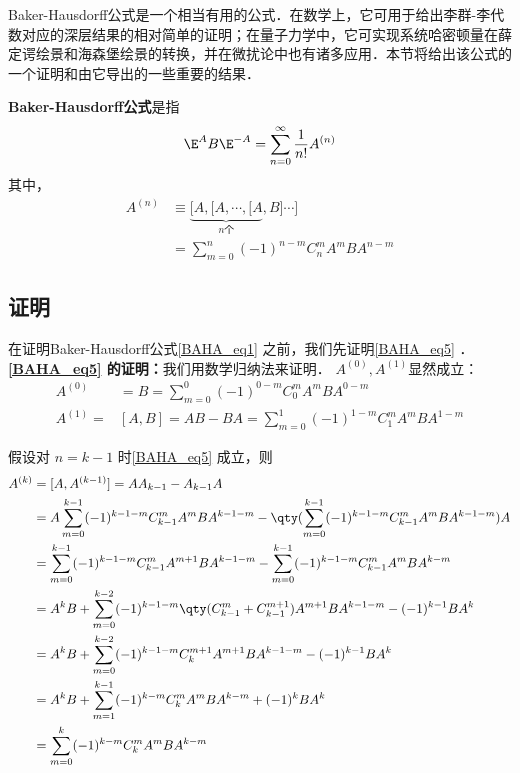 \begin{issues}
\issueTODO
\end{issues}


Baker-Hausdorff公式是一个相当有用的公式．在数学上，它可用于给出李群-李代数对应的深层结果的相对简单的证明；在量子力学中，它可实现系统哈密顿量在薛定谔绘景和海森堡绘景的转换，并在微扰论中也有诸多应用．本节将给出该公式的一个证明和由它导出的一些重要的结果．

\textbf{Baker-Hausdorff公式}是指
\begin{equation}\label{BAHA_eq1}
\E ^{A}B\E^{-A}=\sum_{n=0}^{\infty}\frac{1}{n!}A^{(n)}
\end{equation}
其中，
\begin{equation}\label{BAHA_eq5}
\begin{aligned}
A^{(n)}&\equiv\underbrace{[A,[A,\cdots,[A}_{n\text{个}},B]\cdots]\\
&=\sum_{m=0}^{n}(-1)^{n-m}C_{n}^{m}A^mBA^{n-m}
\end{aligned}
\end{equation}

\subsection{证明}
在证明Baker-Hausdorff公式\autoref{BAHA_eq1} 之前，我们先证明\autoref{BAHA_eq5} ．\\

\textbf{\autoref{BAHA_eq5} 的证明：}我们用数学归纳法来证明．
$A^{(0)},A^{(1)}$显然成立：
\begin{equation}
\begin{aligned}
A^{(0)}&=B=\sum_{m=0}^{0}(-1)^{0-m}C_{0}^{m}A^mBA^{0-m}\\
A^{(1)}=&[A,B]=AB-BA=\sum_{m=0}^{1}(-1)^{1-m}C_{1}^{m}A^mBA^{1-m}
\end{aligned}
\end{equation}

假设对 $n=k-1$ 时\autoref{BAHA_eq5} 成立，则
\begin{equation}
\begin{aligned}
A^{(k)}&=[A,A^{(k-1)}]=AA_{k-1}-A_{k-1}A\\
&=A\sum_{m=0}^{k-1}(-1)^{k-1-m}C_{k-1}^{m}A^mBA^{k-1-m}-\qty(\sum_{m=0}^{k-1}(-1)^{k-1-m}C_{k-1}^{m}A^mBA^{k-1-m})A\\
&=\sum_{m=0}^{k-1}(-1)^{k-1-m}C_{k-1}^{m}A^{m+1}BA^{k-1-m}-\sum_{m=0}^{k-1}(-1)^{k-1-m}C_{k-1}^{m}A^mBA^{k-m}\\
&=A^{k}B+\sum_{m=0}^{k-2}(-1)^{k-1-m}\qty(C_{k-1}^{m}+C_{k-1}^{m+1})A^{m+1}BA^{k-1-m}-(-1)^{k-1}BA^k\\
&=A^{k}B+\sum_{m=0}^{k-2}(-1)^{k-1-m}C_{k}^{m+1}A^{m+1}BA^{k-1-m}-(-1)^{k-1}BA^k\\
&=A^{k}B+\sum_{m=1}^{k-1}(-1)^{k-m}C_{k}^{m}A^{m}BA^{k-m}+(-1)^{k}BA^k\\
&=\sum_{m=0}^{k}(-1)^{k-m}C_{k}^{m}A^{m}BA^{k-m}
\end{aligned}
\end{equation}

